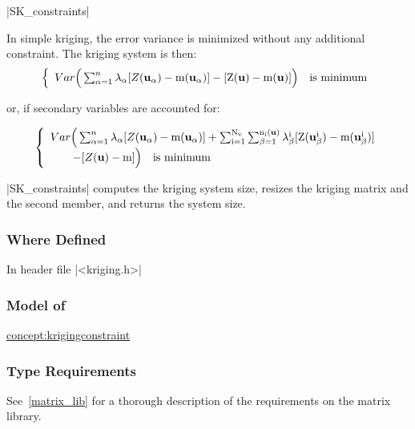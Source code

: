 \documentclass[12pt,twoside]{report}
\newcommand{\mloc}[1]{\rm{\bf #1}}
\begin{document}
|SK_constraints|
\vspace{0.3cm}

In simple kriging, the error variance is minimized without any additional constraint. The kriging system is then:
\begin{displaymath}
  \left\{ \begin{array}{l}
      Var \Big( \sum_{\alpha=1}^{n} \lambda_{\alpha} [Z(\mloc{u}_{\alpha})-m(\mloc{u}_{\alpha})] - [Z(\mloc{u})-m(\mloc{u})] \Big) \quad \textrm{is minimum} \\ 
    \end{array} \right.
\end{displaymath}

\noindent or, if secondary variables are accounted for:

\begin{displaymath}
  \left\{ \begin{array}{l}
      Var \Big( \sum_{\alpha=1}^{n} \lambda_{\alpha} [Z(\mloc{u}_{\alpha})-m(\mloc{u}_{\alpha})] + \sum_{i=1}^{N_v} \sum_{\beta=1}^{n_i(\mloc{u})}\lambda_{\beta}^i [Z(\mloc{u}_{\beta}^i)-m(\mloc{u}_{\beta}^i)] \\ \qquad - [Z(\mloc{u})-m] \Big) \quad \textrm{is minimum} \\ 
    \end{array} \right.
\end{displaymath}

|SK_constraints| computes the kriging system size, resizes the kriging matrix and the second member, and returns the system size.


\htmlrule[CLEAR=all]  \subsubsection*{Where Defined}
In header file |<kriging.h>|



\htmlrule[CLEAR=all]  \subsubsection*{Model of}
\hyperref{Kriging Constraint}{Kriging Constraint}{}{concept:krigingconstraint}

\htmlrule[CLEAR=all]  \subsubsection*{Type Requirements}
See~\ref{matrix_lib} for a thorough description of the requirements on the matrix library.
\end{document}
